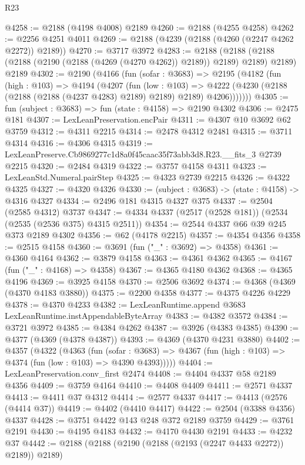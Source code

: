 \begin{lexlean}{R23}
\begin{coremodule}
@4258 := @2188 (@4198 @4008) @2189
@4260 := @2188 (@4255 @4258)
@4262 := @2256 @4251 @4011
@4269 := @2188 (@4239 (@2188 (@4260 (@2247 @4262 @2272)) @2189))
@4270 := @3717 @3972
@4283 := @2188
    (@2188 (@2188 (@2188 (@2190 (@2188 (@4269 (@4270 @4262)) @2189)) @2189) @2189) @2189)
    @2189
@4302 := @2190
    (@4166
      (fun (sofar : @3683) =>
      @2195
        (@4182
          (fun (high : @103) =>
          @4194
            (@4207
              (fun (low : @103) =>
              @4222 (@4230 (@2188 (@2188 (@2188 (@4237 @4283) @2189) @2189) @2189) @4206)))))))
@4305 := fun (subject : @3683) => fun (state : @4158) => @2190 @4302
@4306 := @2475 @181
@4307 := LexLeanPreservation.encPair
@4311 := @4307 @10 @3692 @62 @3759
@4312 := @4311 @2215
@4314 := @2478 @4312 @2481
@4315 := @3711 @4314
@4316 := @4306 @4315
@4319 := LexLeanPreserve.Cb9869277c1d8a0f45caac35f73abb3d8.R23.__fits_3 @2739 @2215
@4320 := @2484 @4319
@4322 := @3757 @4158 @4311
@4323 := LexLeanStd.Numeral.pairStep
@4325 := @4323 @2739 @2215
@4326 := @4322 @4325
@4327 := @4320 @4326
@4330 := (subject : @3683) -> (state : @4158) -> @4316 @4327
@4334 := @2496 @181 @4315 @4327 @375
@4337 := @2504 (@2585 @4312) @3737
@4347 := @4334 @4337 (@2517 (@2528 @181)) (@2534 (@2535 (@2536 @375) @4315 @2511))
@4354 := @2544 @4337 @66 @39 @245 @373 @2189 @4302
@4356 := @62 (@4178 @2215)
@4357 := @4354 @4356
@4358 := @2515 @4158
@4360 := @3691 (fun ("_" : @3692) => @4358)
@4361 := @4360 @4164
@4362 := @3879 @4158
@4363 := @4361 @4362
@4365 := @4167 (fun ("_" : @4168) => @4358)
@4367 := @4365 @4180 @4362
@4368 := @4365 @4196
@4369 := @3925 @4158
@4370 := @2506 @3692
@4374 := @4368 (@4369 (@4370 @4183 @3880))
@4375 := @2200 @4358
@4377 := @4375 @4226 @4229
@4378 := @4370 @4233
@4382 := LexLeanRuntime.append @3683 LexLeanRuntime.instAppendableByteArray
@4383 := @4382 @3572
@4384 := @3721 @3972
@4385 := @4384 @4262
@4387 := @3926 (@4383 @4385)
@4390 := @4377 (@4369 (@4378 @4387))
@4393 := @4369 (@4370 @4231 @3880)
@4402 := @4357
    (@4322
      (@4363
        (fun (sofar : @3683) =>
        @4367 (fun (high : @103) => @4374 (fun (low : @103) => @4390 @4393)))))
@4404 := LexLeanPreservation.conv_first @2474
@4408 := @4404 @4337 @58 @2189 @4356
@4409 := @3759 @4164
@4410 := @4408 @4409
@4411 := @2571 @4337
@4413 := @4411 @37 @4312
@4414 := @2577 @4337
@4417 := @4413 (@2576 (@4414 @37))
@4419 := @4402 (@4410 @4417)
@4422 := @2504 (@3388 @4356) @4337
@4428 := @3751 @4422 @143 @248 @372 @2189 @3759
@4429 := @3761 @2191
@4430 := @4195 @4183
@4432 := @4170 @4430 @2191
@4433 := @4232 @37
@4442 := @2188 (@2188 (@2190 (@2188 (@2193 (@2247 @4433 @2272)) @2189)) @2189)

\end{coremodule}
\end{lexlean}
